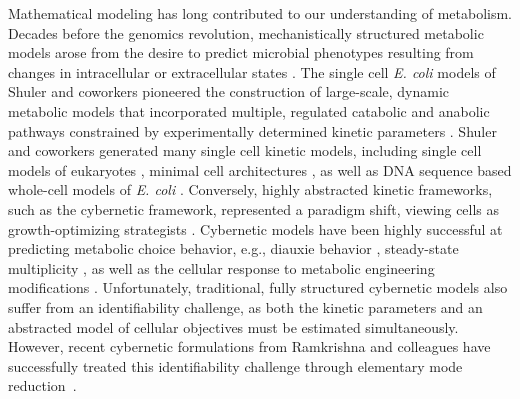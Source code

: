 \documentclass[12pt]{article}
\begin{document}
Mathematical modeling has long contributed to our understanding of metabolism.
Decades before the genomics revolution, mechanistically structured metabolic models arose from the desire to predict microbial phenotypes resulting from changes in intracellular or extracellular states \citep{1976_fredrickson_BiotechBioeng}.
The single cell \textit{E. coli} models of Shuler and coworkers pioneered the construction of large-scale, dynamic metabolic models that incorporated multiple, regulated catabolic and anabolic pathways constrained by experimentally determined kinetic parameters \citep{1984_domach_shuler_BiotechBioeng_01}.
Shuler and coworkers generated many single cell kinetic models, including single cell models of eukaryotes \citep{1989_steinmeyer_shuler_ChemEngSci,1992_wu_shuler_AnnNYAcadSci}, minimal cell architectures \citep{2004_castellanos_shuler_PNAS}, as well as DNA sequence based whole-cell models of \textit{E. coli} \citep{2008_atlas_shuler_IETSysBio}.
Conversely, highly abstracted kinetic frameworks, such as the cybernetic framework, represented a paradigm shift, viewing cells as growth-optimizing strategists \citep{1985_dhurjati_ramkrishna_tsao_BiotechBioeng}.
Cybernetic models have been highly successful at predicting metabolic choice behavior, e.g., diauxie behavior \citep{1986_kompala_ramkrishna_tsao_BiotechBioeng}, steady-state multiplicity \citep{2012_kim_ramkrishna_BiotechProg}, as well as the cellular response to metabolic engineering modifications \citep{1999_varner_ramkrishna_MetaEng}.
Unfortunately, traditional, fully structured cybernetic models also suffer from an identifiability challenge, as both the kinetic parameters and an abstracted model of cellular objectives must be estimated simultaneously.
However, recent cybernetic formulations from Ramkrishna and colleagues have successfully treated this identifiability challenge through elementary mode reduction~\cite{2009_song_ramkrishna_BiotechBioeng,Song:2011aa}.
\end{document}
